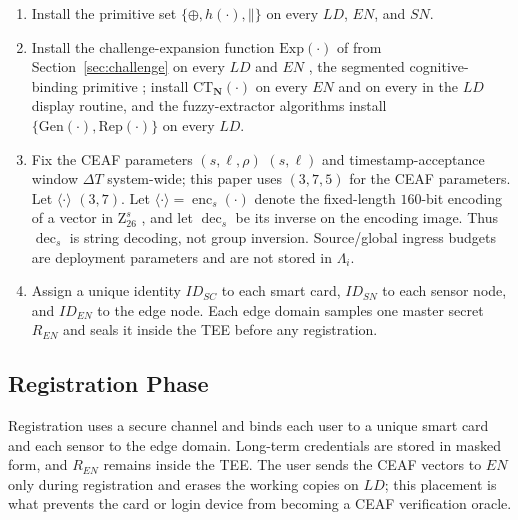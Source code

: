 \documentclass[cmc,article,submit,moreauthors,pdftex]{Definitions/tsp}
\renewcommand{\mathsf}[1]{\mathrm{#1}}
\renewcommand{\mathbb}[1]{\mathrm{#1}}
\newcommand{\cc}{\mathbin{\|}}
\newcommand{\CT}{\mathsf{CT}}
\newcommand{\Gen}{\mathrm{Gen}}
\newcommand{\Rep}{\mathrm{Rep}}
\providecommand{\DIFadd}[1]{{\protect\color{blue} \sf #1}} %
\providecommand{\DIFdel}[1]{{\protect\color{red} \scriptsize #1}} %
\providecommand{\DIFaddbegin}{} %
\providecommand{\DIFaddend}{} %
\providecommand{\DIFdelbegin}{} %
\providecommand{\DIFdelend}{} %
\begin{document}
\begin{enumerate}
\item Install the primitive set $\{\oplus, h(\cdot), \cc\}$ on every $LD$, $EN$, and $SN$.
\item Install \DIFdelbegin \DIFdel{the challenge-expansion function }\DIFdelend $\mathsf{Exp}(\cdot)$ \DIFdelbegin \DIFdel{of }\DIFdelend \DIFaddbegin \DIFadd{from }\DIFaddend Section~\ref{sec:challenge} on every $LD$ and $EN$\DIFdelbegin \DIFdel{, the segmented cognitive-binding primitive }\DIFdelend \DIFaddbegin \DIFadd{; install }\DIFaddend $\CT_{\mathbf{N}}(\cdot)$ on every $EN$ and \DIFdelbegin \DIFdel{on every }\DIFdelend \DIFaddbegin \DIFadd{in the }\DIFaddend $LD$ display routine, and \DIFdelbegin \DIFdel{the fuzzy-extractor algorithms }\DIFdelend \DIFaddbegin \DIFadd{install }\DIFaddend $\{\Gen(\cdot),\Rep(\cdot)\}$ on every $LD$.
\item Fix the CEAF parameters \DIFdelbegin \DIFdel{$(s,\ell,\rho)$ }\DIFdelend \DIFaddbegin \DIFadd{$(s,\ell)$ }\DIFaddend and timestamp-acceptance window $\Delta T$ system-wide; this paper uses \DIFdelbegin \DIFdel{$(3,7,5)$ for the CEAF parameters. Let $\langle\cdot\rangle$ }\DIFdelend \DIFaddbegin \DIFadd{$(3,7)$. Let $\langle\cdot\rangle=\operatorname{enc}_s(\cdot)$ }\DIFaddend denote the fixed-length $160$-bit encoding of a vector in $\mathbb{Z}_{26}^{s}$\DIFaddbegin \DIFadd{, and let $\operatorname{dec}_s$ be its inverse on the encoding image. Thus $\operatorname{dec}_s$ is string decoding, not group inversion. Source/global ingress budgets are deployment parameters and are not stored in $\Lambda_i$}\DIFaddend .
\item Assign a unique identity $ID_{SC}$ to each smart card, $ID_{SN}$ to each sensor node, and $ID_{EN}$ to the edge node. Each edge domain samples one master secret $R_{EN}$ and seals it inside the TEE before any registration.
\end{enumerate}

\subsection{Registration Phase}\label{sec:registration}

Registration uses a secure channel and binds each user to a unique smart card and each sensor to the edge domain. Long-term credentials are stored in masked form, and $R_{EN}$ remains inside the TEE. The user sends the CEAF vectors to $EN$ only during registration and erases the working copies on $LD$; this placement \DIFdelbegin \DIFdel{is what }\DIFdelend prevents the card or login device from becoming a CEAF verification oracle.
\end{document}
